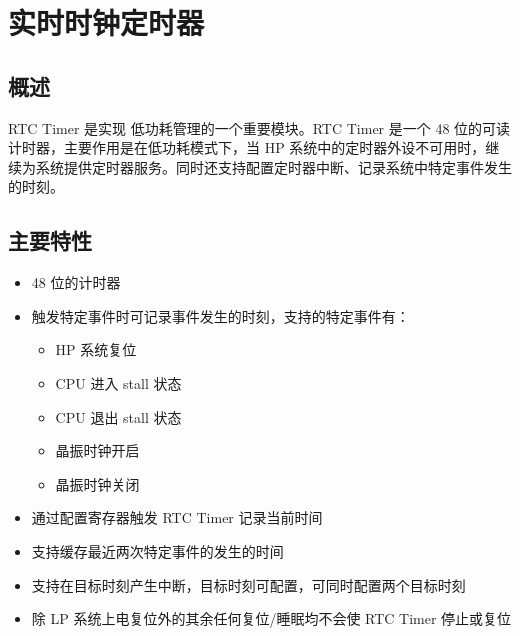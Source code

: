 \documentclass[main\_\_CN.tex]{subfiles}
\begin{document}

\ifglobal
\else
    {\let\clearpage\relax \listoftodos}
    {\let\clearpage\relax \listofdonetodos}
    \tableofcontents
\fi



\hypertarget{rtctimer}{}
\chapter{实时时钟定时器}
\label{mod:rtctimer}

\section{概述}

RTC Timer 是实现 \chipname{} 低功耗管理的一个重要模块。RTC Timer 是一个 48 位的可读计时器，主要作用是在低功耗模式下，当 HP 系统中的定时器外设不可用时，继续为系统提供定时器服务。同时还支持配置定时器中断、记录系统中特定事件发生的时刻。

\section{主要特性}
\label{sec:rtctimer-features}
\begin{itemize}
    \item 48 位的计时器
    \item 触发特定事件时可记录事件发生的时刻，支持的特定事件有：
    \begin{itemize}
        \item HP 系统复位
        \item CPU 进入 stall 状态
        \item CPU 退出 stall 状态
        \item 晶振时钟开启
        \item 晶振时钟关闭
    \end{itemize}
    \item 通过配置寄存器触发 RTC Timer 记录当前时间
    \item 支持缓存最近两次特定事件的发生的时间
    \item 支持在目标时刻产生中断，目标时刻可配置，可同时配置两个目标时刻
    \item 除 LP 系统上电复位外的其余任何复位/睡眠均不会使 RTC Timer 停止或复位
\end{itemize}
\end{document}
